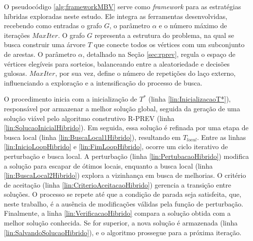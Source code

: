 O pseudocódigo \ref{alg:frameworkMBV} serve como \textit{framework} para as estratégias híbridas exploradas neste estudo. Ele integra as ferramentas desenvolvidas, recebendo como entradas o grafo \textbf{$G$}, o parâmetro \textbf{$\alpha$} e o número máximo de iterações \textbf{$MaxIter$}. O grafo \textbf{$G$} representa a estrutura do problema, na qual se busca construir uma árvore $T$ que conecte todos os vértices com um subconjunto de arestas. O parâmetro \textbf{$\alpha$}, detalhado na Seção \ref{sec:rprev}, regula o espaço de vértices elegíveis para sorteios, balanceando entre a aleatoriedade e decisões gulosas. \textbf{$MaxIter$}, por sua vez, define o número de repetições do laço externo, influenciando a exploração e a intensificação do processo de busca.

O procedimento inicia com a inicialização de \textbf{$T^*$} (linha \ref{lin:InicializacaoT*}), responsável por armazenar a melhor solução global, seguida da geração de uma solução viável pelo algoritmo construtivo R-PREV (linha \ref{lin:SolucaoInicialHibrido}). Em seguida, essa solução é refinada por uma etapa de busca local (linha \ref{lin:BuscaLocal1Hibrido}), resultando em \textbf{$T_{local}$}. Entre as linhas \ref{lin:InicioLoopHibrido} e \ref{lin:FimLoopHibrido}, ocorre um ciclo iterativo de perturbação e busca local. A perturbação (linha \ref{lin:PertubacaoHibrido}) modifica a solução para escapar de ótimos locais, enquanto a busca local (linha \ref{lin:BuscaLocal2Hibrido}) explora a vizinhança em busca de melhorias. O critério de aceitação (linha \ref{lin:CriterioAceitacaoHibrido}) gerencia a transição entre soluções. O processo se repete até que a condição de parada seja satisfeita, que, neste trabalho, é a ausência de modificações válidas pela função de perturbação. Finalmente, a linha \ref{lin:VerificacaoHibrido} compara a solução obtida com a melhor solução conhecida. Se for superior, a nova solução é armazenada (linha \ref{lin:SalvandoSolucaoHibrido}), e o algoritmo prossegue para a próxima iteração.


